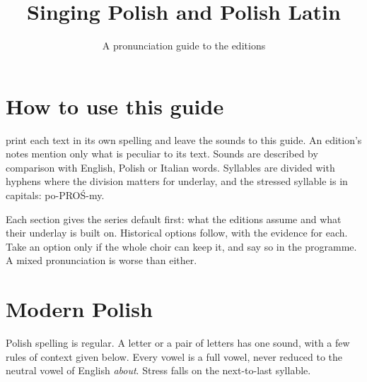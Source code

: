 \documentclass[guide]{pol-ren}
\title[Pronunciation]{Singing Polish and Polish Latin}
\subtitle{A pronunciation guide to the editions}
\begin{document}
\maketitlepage
\colophon

\section*{How to use this guide}

 print each text in its own spelling and leave the
sounds to this guide. An edition’s notes mention only what is peculiar to its
text. Sounds are described by comparison with English, Polish or Italian
words. Syllables are divided with hyphens where the division matters for
underlay, and the stressed syllable is in capitals: po-PROŚ-my.

Each section gives the series default first: what the editions assume and what
their underlay is built on. Historical options follow, with the evidence for
each. Take an option only if the whole choir can keep it, and say so in the
programme. A mixed pronunciation is worse than either.

\section*{Modern Polish}

Polish spelling is regular. A letter or a pair of letters has one sound, with
a few rules of context given below. Every vowel is a full vowel, never
reduced to the neutral vowel of English \textit{about}. Stress falls on the
next-to-last syllable.
\end{document}
